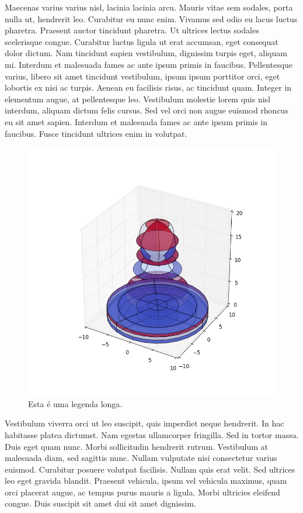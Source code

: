 \documentclass{article}
\begin{document}
	Maecenas varius varius nisl, lacinia lacinia arcu. Mauris vitae sem sodales, porta nulla ut, hendrerit leo. Curabitur eu nunc enim. Vivamus sed odio eu lacus luctus pharetra. Praesent auctor tincidunt pharetra. Ut ultrices lectus sodales scelerisque congue. Curabitur luctus ligula ut erat accumsan, eget consequat dolor dictum. Nam tincidunt sapien vestibulum, dignissim turpis eget, aliquam mi. Interdum et malesuada fames ac ante ipsum primis in faucibus. Pellentesque varius, libero sit amet tincidunt vestibulum, ipsum ipsum porttitor orci, eget lobortis ex nisi ac turpis. Aenean eu facilisis risus, ac tincidunt quam. Integer in elementum augue, at pellentesque leo. Vestibulum molestie lorem quis nisl interdum, aliquam dictum felis cursus. Sed vel orci non augue euismod rhoncus eu sit amet sapien. Interdum et malesuada fames ac ante ipsum primis in faucibus. Fusce tincidunt ultrices enim in volutpat.
	
	\begin{figure}[H]
		\centering
		\includegraphics[width=0.7\linewidth]{figuras/figure_2}
		\caption[Leganda Curta]{Esta é uma legenda longa.}
		\label{fig:figure_2}
	\end{figure}
	
	Vestibulum viverra orci ut leo suscipit, quis imperdiet neque hendrerit. In hac habitasse platea dictumst. Nam egestas ullamcorper fringilla. Sed in tortor massa. Duis eget quam nunc. Morbi sollicitudin hendrerit rutrum. Vestibulum at malesuada diam, sed sagittis nunc. Nullam vulputate nisi consectetur varius euismod. Curabitur posuere volutpat facilisis. Nullam quis erat velit. Sed ultrices leo eget gravida blandit. Praesent vehicula, ipsum vel vehicula maximus, quam orci placerat augue, ac tempus purus mauris a ligula. Morbi ultricies eleifend congue. Duis suscipit sit amet dui sit amet dignissim.
	
\end{document}
